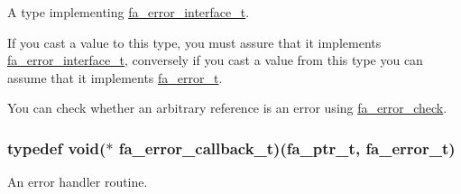 A type implementing \hyperlink{structfa__error__interface__t}{fa\-\_\-error\-\_\-interface\-\_\-t}. 

If you cast a value to this type, you must assure that it implements \hyperlink{structfa__error__interface__t}{fa\-\_\-error\-\_\-interface\-\_\-t}, conversely if you cast a value from this type you can assume that it implements \hyperlink{group___fa_error_ga4a4feb4d3686657ac8dbd2be421cbb15}{fa\-\_\-error\-\_\-t}.

You can check whether an arbitrary reference is an error using \hyperlink{group___fa_error_gab7550192e471f82582ecb441949c8b62}{fa\-\_\-error\-\_\-check}. \hypertarget{group___fa_error_ga43d8d45a005130a5052ba3281a8bf33e}{
\subsubsection[{fa\-\_\-error\-\_\-callback\-\_\-t}]{\setlength{\rightskip}{0pt plus 5cm}typedef void($\ast$  fa\-\_\-error\-\_\-callback\-\_\-t)({\bf fa\-\_\-ptr\-\_\-t}, {\bf fa\-\_\-error\-\_\-t})}}\label{group___fa_error_ga43d8d45a005130a5052ba3281a8bf33e}


An error handler routine. 



